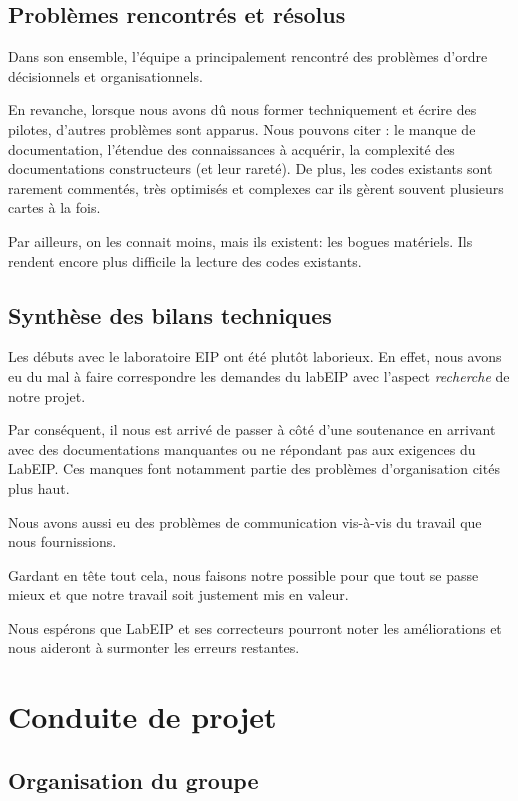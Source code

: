 \documentclass[francais]{rtxreport}
\begin{document}
\section{Problèmes rencontrés et résolus}

Dans son ensemble, l'équipe a principalement rencontré des problèmes d'ordre
décisionnels et organisationnels.

En revanche, lorsque nous avons dû nous former techniquement et écrire des
pilotes, d'autres problèmes sont apparus. Nous pouvons citer : le manque de
documentation, l’étendue des connaissances à acquérir, la complexité des
documentations constructeurs (et leur rareté). De plus, les codes existants sont
rarement commentés, très optimisés et complexes car ils gèrent souvent
plusieurs cartes à la fois.

Par ailleurs, on les connait moins, mais ils existent: les bogues matériels.
Ils rendent encore plus difficile la lecture des codes existants.

\section{Synthèse des bilans techniques}

Les débuts avec le laboratoire EIP ont été plutôt laborieux. En effet, nous
avons eu du mal à faire correspondre les demandes du labEIP avec l'aspect
\emph{recherche} de notre projet.

Par conséquent, il nous est arrivé de passer à côté d’une soutenance en arrivant
avec des documentations manquantes ou ne répondant pas aux exigences du LabEIP.
Ces manques font notamment partie des problèmes d'organisation cités plus haut.

Nous avons aussi eu des problèmes de communication vis-à-vis du travail que nous
fournissions.

Gardant en tête tout cela, nous faisons notre possible pour que tout se passe
mieux et que notre travail soit justement mis en valeur.

Nous espérons que LabEIP et ses correcteurs pourront noter les améliorations et
nous aideront à surmonter les erreurs restantes.

\chapter{Conduite de projet}

\section{Organisation du groupe}
\end{document}

